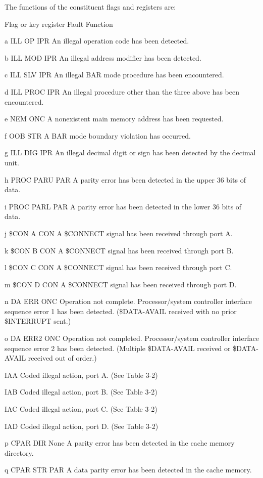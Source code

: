 The functions of the constituent flags and registers are:

Flag or key register Fault Function

a ILL OP IPR An illegal operation code has been detected.

b ILL MOD IPR An illegal address modifier has been detected.

c ILL SLV IPR An illegal BAR mode procedure has been encountered.

d ILL PROC IPR An illegal procedure other than the three above has been encountered.

e NEM ONC A nonexistent main memory address has been requested.

f OOB STR A BAR mode boundary violation has occurred.

g ILL DIG IPR An illegal decimal digit or sign has been detected by the decimal unit.

h PROC PARU PAR A parity error has been detected in the upper 36 bits of data.

i PROC PARL PAR A parity error has been detected in the lower 36 bits of data.

j \$CON A CON A \$CONNECT signal has been received through port A.

k \$CON B CON A \$CONNECT signal has been received through port B.

l \$CON C CON A \$CONNECT signal has been received through port C.

m \$CON D CON A \$CONNECT signal has been received through port D.

n DA ERR ONC Operation not complete.  Processor/system controller interface sequence error 1 has been detected. (\$DATA-AVAIL received with no prior \$INTERRUPT sent.)

o DA ERR2 ONC Operation not completed.  Processor/system controller interface sequence error 2 has been detected. (Multiple \$DATA-AVAIL received or \$DATA-AVAIL received out of order.)

IAA Coded illegal action, port A. (See Table 3-2)

IAB Coded illegal action, port B. (See Table 3-2)

IAC Coded illegal action, port C. (See Table 3-2)

IAD Coded illegal action, port D. (See Table 3-2)

p CPAR DIR None A parity error has been detected in the cache memory directory.

q CPAR STR PAR A data parity error has been detected in the cache memory.


